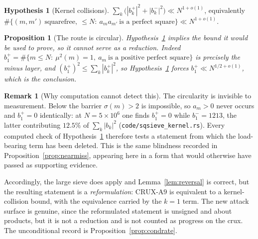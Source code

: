 \documentclass[11pt]{article}
\newtheorem{proposition}[theorem]{Proposition}
\theoremstyle{definition}
\newtheorem{hypothesis}[theorem]{Hypothesis}
\newtheorem{remark}[theorem]{Remark}
\begin{document}
\begin{hypothesis}[Kernel collisions]\label{hyp:kernel}
$\sum_k\bigl(|b^{+}_k|^2+|b^{-}_k|^2\bigr)\ll N^{1+o(1)}$, equivalently
$\#\{(m,m')\ \text{squarefree},\ \le N:\ a_ma_{m'}\ \text{is a perfect square}\}\ll N^{1+o(1)}$.
\end{hypothesis}

\begin{proposition}[The route is circular]\label{prop:circular}
Hypothesis~\textup{\ref{hyp:kernel}} implies the bound it would be used to prove, so it cannot serve
as a reduction. Indeed $b^{+}_1=\#\{m\le N:\ \mu^2(m)=1,\ a_m\ \text{is a positive perfect square}\}$ is precisely
the minus layer, and $(b^{+}_1)^2\le\sum_k|b^{+}_k|^2$, so
Hypothesis~\textup{\ref{hyp:kernel}} forces $b^{+}_1\ll N^{1/2+o(1)}$, which is the conclusion.
\end{proposition}

\begin{remark}[Why computation cannot detect this]\label{rem:invisiblecirc}
The circularity is invisible to measurement. Below the barrier $\sigma(m)>2$ is impossible, so
$a_m>0$ never occurs and $b^{+}_1=0$ identically: at $N=5\times10^6$ one finds $b^{+}_1=0$ while
$b^{-}_1=1213$, the latter contributing $12.5\%$ of $\sum_k|b_k|^2$
\textup{(\texttt{code/sqsieve\_kernel.rs})}. Every computed check of
Hypothesis~\ref{hyp:kernel} therefore tests a statement from which the load-bearing term has been
deleted. This is the same blindness recorded in Proposition~\ref{prop:nearmiss}, appearing here in a
form that would otherwise have passed as supporting evidence.

Accordingly, the large sieve does apply and Lemma~\ref{lem:reversal} is correct, but the resulting
statement is a \emph{reformulation}: $\mathrm{CRUX}\text{-}\mathrm{A}9$ is equivalent to a kernel-collision
bound, with the equivalence carried by the $k=1$ term. The new attack surface is genuine, since the
reformulated statement is unsigned and about products, but it is not a reduction and is not counted
as progress on the crux. The unconditional record is Proposition~\ref{prop:condrate}.
\end{remark}
\end{document}
